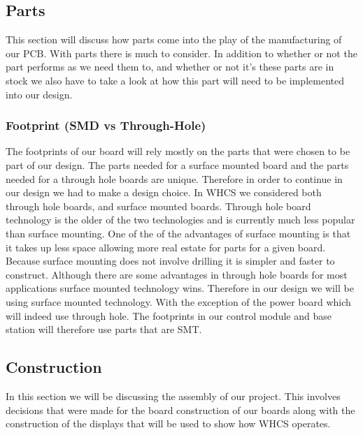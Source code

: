 \subsection{Parts}
This section will discuss how parts come into the play of the manufacturing of
our PCB. With parts there is much to consider. In addition to whether or not
the part performs as we need them to, and whether or not it{}'s these parts are
in stock we also have to take a look at how this part will need to be
implemented into our design.

\subsubsection{Footprint (SMD vs Through-Hole)}
The footprints of our board will rely mostly on the parts that were chosen to
be part of our design. The parts needed for a surface mounted board and the
parts needed for a through hole boards are unique. Therefore in order to
continue in our design we had to make a design choice. In WHCS we considered
both through hole boards, and surface mounted boards. Through hole board
technology is the older of the two technologies and is currently much less
popular than surface mounting. One of the of the advantages of surface mounting
is that it takes up less space allowing more real estate for parts for a given
board. Because surface mounting does not involve drilling it is simpler and
faster to construct. Although there are some advantages in through hole boards
for most applications surface mounted technology wins. Therefore in our design
we will be using surface mounted technology. With the exception of the power
board which will indeed use through hole. The footprints in our control module
and base station will therefore use parts that are SMT.

\subsection{Construction}
In this section we will be discussing the assembly of our project. This
involves decisions that were made for the board construction of our boards
along with the construction of the displays that will be used to show how WHCS
operates.

